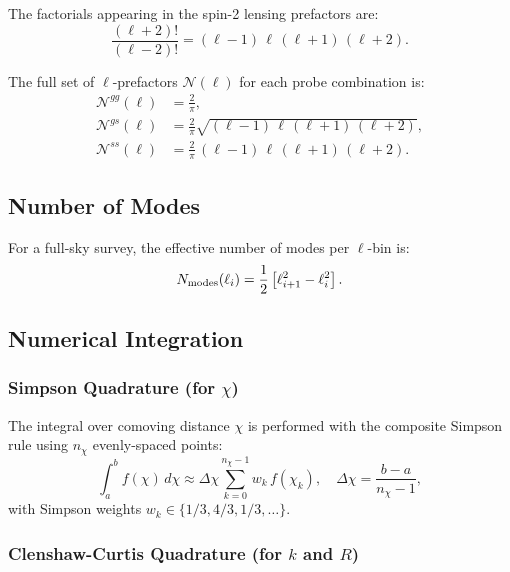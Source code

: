 The factorials appearing in the spin-2 lensing prefactors are:
\begin{equation}
    \frac{(\ell+2)!}{(\ell-2)!} = (\ell-1)\,\ell\,(\ell+1)\,(\ell+2).
\end{equation}

The full set of $\ell$-prefactors $\mathcal{N}(\ell)$ for each probe
combination is:
\begin{align}
    \mathcal{N}^{gg}(\ell) &= \frac{2}{\pi}, \\
    \mathcal{N}^{gs}(\ell) &= \frac{2}{\pi}\sqrt{(\ell-1)\,\ell\,(\ell+1)\,(\ell+2)}, \\
    \mathcal{N}^{ss}(\ell) &= \frac{2}{\pi}\,(\ell-1)\,\ell\,(\ell+1)\,(\ell+2).
\end{align}

\subsection{Number of Modes}

For a full-sky survey, the effective number of modes per $\ell$-bin is:
\begin{equation}
    N_{\rm modes}(\ell_i) = \frac{1}{2}\left[\ell_{i+1}^2 - \ell_i^2\right].
\end{equation}

\subsection{Numerical Integration}

\subsubsection{Simpson Quadrature (for $\chi$)}

The integral over comoving distance $\chi$ is performed with the composite
Simpson rule using $n_\chi$ evenly-spaced points:
\begin{equation}
    \int_a^b f(\chi)\,d\chi \approx \Delta\chi \sum_{k=0}^{n_\chi - 1} w_k\,f(\chi_k),
    \quad \Delta\chi = \frac{b-a}{n_\chi - 1},
\end{equation}
with Simpson weights $w_k \in \{1/3, 4/3, 1/3, \ldots\}$.

\subsubsection{Clenshaw-Curtis Quadrature (for $k$ and $R$)}

